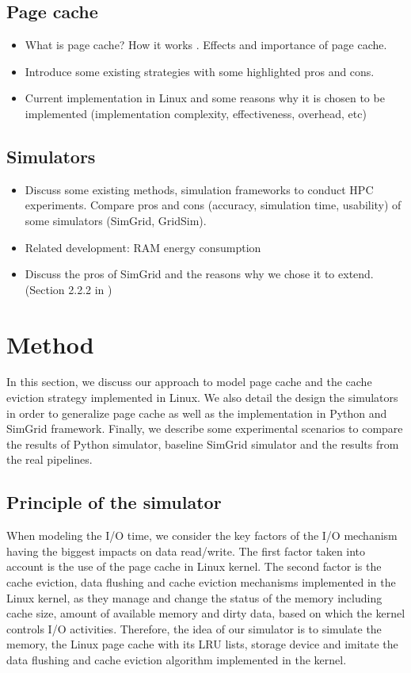 \documentclass[conference]{IEEEtran}
\begin{document}
		\subsection{Page cache}
			\begin{itemize}
				\item What is page cache? How it works \cite{linuxdev3rd2010}. Effects and importance of page cache.
				\item Introduce some existing strategies with some highlighted pros and cons.
				\item Current implementation in Linux and some reasons why it is chosen to be implemented (implementation complexity, effectiveness, overhead, etc) \cite{linuxdev3rd2010}
			\end{itemize}									

		\subsection{Simulators}
			\begin{itemize}
				\item Discuss some existing methods, simulation frameworks to conduct HPC experiments. Compare pros and cons (accuracy, simulation time, usability) of some simulators (SimGrid, GridSim).
				\item Related development: RAM energy consumption \cite{gill2019} \cite{ouarnoughi2017} 
				\item Discuss the pros of SimGrid and the reasons why we chose it to extend. (Section 2.2.2 in \cite{casanova2014})
			\end{itemize}
			
	\section{Method}
		In this section, we discuss our approach to model page cache and
		the cache eviction strategy implemented in Linux. We also detail
		the design the simulators in order to generalize page cache as well
		as the implementation in Python and SimGrid framework. Finally, we
		describe some experimental scenarios to compare the results of
		Python simulator, baseline SimGrid simulator and the results from
		the real pipelines. 

		\subsection{Principle of the simulator}
	
			When modeling the I/O time, we consider the key factors of the
			I/O mechanism having the biggest impacts on data read/write.
			The first factor taken into account is the use of the page
			cache in Linux kernel. The second factor  is the cache eviction, 
			data flushing and cache eviction mechanisms implemented in the 
			Linux kernel, as they manage and change the status of the memory 
			including cache size, amount of available memory and 
			dirty data, based on which the kernel controls I/O activities. Therefore, 
			the idea of our simulator is to simulate the memory, the Linux 
			page cache with its LRU lists, storage device and imitate the data flushing 
			and cache eviction algorithm implemented in the kernel. 
			
\end{document}
